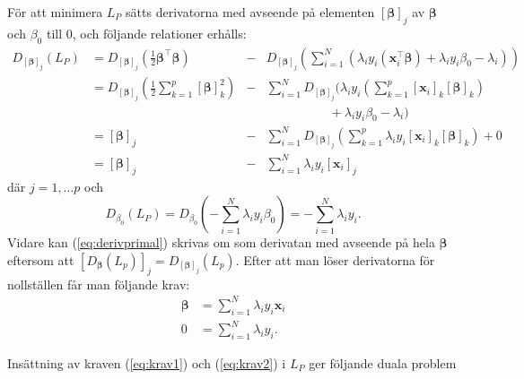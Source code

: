\documentclass[a4paper, 12pt]{report}
\theoremstyle{definition}
\theoremstyle{remark}
\newcommand{\bfbeta}{{\boldsymbol{\beta}}}
\newcommand{\bfx}{\mathbf{x}}
\begin{document}
För att minimera $L_P$ sätts derivatorna med avseende på elementen $\left[\bfbeta\right]_j$ av $\bfbeta$ och $\beta_0$ till 0, och följande relationer erhålls:
\begin{equation}\label{eq:derivprimal}
\begin{aligned}
	D_{ \left[\bfbeta\right]_j } \left(L_P\right) &= D_{ \left[\bfbeta\right]_j } \left( \frac{1}{2} \bfbeta^\intercal \bfbeta \right) &- &D_{ \left[\bfbeta\right]_j } \left( \sum_{i=1}^{N} \left( \lambda_i y_i \left( \bfx_i^\intercal\bfbeta \right) + \lambda_i y_i \beta_0 - \lambda_i \right)\right)\\
	&= D_{ \left[\bfbeta\right]_j } \left( \frac{1}{2} \sum_{k=1}^{p} \left[\bfbeta\right]_k^2 \right)
	&- &\sum_{i=1}^{N} D_{ \left[\bfbeta\right]_j }
	\Big(  \lambda_i y_i \left( \sum_{k=1}^{p} \left[\mathbf{x}_i\right]_k \left[ \bfbeta \right]_k \right)\\
	& & &\qquad\qquad\quad+ \lambda_i y_i \beta_0-\lambda_i \Big)\\
	&= [\bfbeta]_j &- &\sum_{i=1}^{N} D_{ \left[\bfbeta\right]_j } \left( \sum_{k=1}^{p} \lambda_i y_i \left[\mathbf{x}_i\right]_k\left[\bfbeta\right]_k \right) + 0\\
	&= [\bfbeta]_j &- &\sum_{i=1}^{N}\lambda_i y_i \left[ \mathbf{x}_i \right]_j
\end{aligned}
\end{equation}
där $j=1,\dots p$ och
\begin{equation*}
	D_{\beta_0}\left(L_P\right) = D_{\beta_0}\left( -\sum_{i=1}^{N} \lambda_i y_i \beta_0 \right) = -\sum_{i=1}^{N} \lambda_i y_i.
\end{equation*}
Vidare kan (\ref{eq:derivprimal}) skrivas om som derivatan med avseende på hela $\bfbeta$ eftersom att $ \left[ D_{ \bfbeta }\left(L_p\right) \right]_j = D_{\left[ \bfbeta \right]_j}\left(L_p\right) $. Efter att man löser derivatorna för nollställen får man följande krav:
\begin{align}\label{eq:krav1}
	\bfbeta &= \sum_{i=1}^{N} \lambda_i y_i \mathbf{x}_i\\
	0 &= \sum_{i=1}^{N} \lambda_i y_i.\label{eq:krav2}
\end{align}

Insättning av kraven (\ref{eq:krav1}) och (\ref{eq:krav2}) i $L_P$ ger följande duala problem
\end{document}
